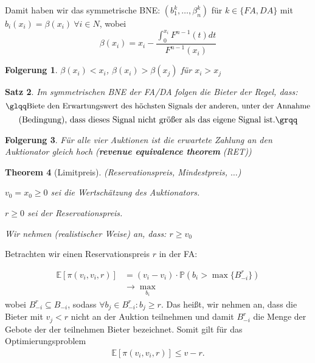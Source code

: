\documentclass[12pt]{extreport} %
\theoremstyle{named}
\newtheorem{unnamedtheorem}{Theorem} \counterwithin{unnamedtheorem}{chapter}
\theoremstyle{itshape}
\newtheorem{satz}[unnamedtheorem]{Satz}
\theoremstyle{normal}
\newtheorem{folgerung}[unnamedtheorem]{Folgerung}
\begin{document}
Damit haben wir das symmetrische BNE: $(b_{1}^{k}, \dotsc, \beta_{n}^{k})$ für $k \in \{ FA, DA \}$ mit $b_{i}(x_{i}) = \beta(x_{i}) ~\forall i \in N$, wobei
$$ \beta(x_{i}) = x_{i} - \frac{\int_{0}^{x_{i}}F^{n-1}(t) dt}{F^{n-1}(x_{i})} $$

\begin{folgerung}
	$\beta(x_{i}) < x_{i}$, $\beta(x_{i}) > \beta(x_{j})$ für $x_{i} > x_{j}$
\end{folgerung}

\begin{satz}
	Im symmetrischen BNE der FA/DA folgen die Bieter der Regel, dass: 
	$$ \text{{\glqq}Biete den Erwartungswert des höchsten Signals der anderen, unter der Annahme} $$
	$$ \text{(Bedingung), dass dieses Signal nicht größer als das eigene Signal ist.\grqq} $$
\end{satz}

\begin{folgerung}
	Für alle vier Auktionen ist die erwartete Zahlung an den Auktionator gleich hoch (\textbf{revenue equivalence theorem} (RET))
\end{folgerung}

\begin{unnamedtheorem}[Limitpreis] (Reservationspreis, Mindestpreis, $\dotsc$) 
\begin{description}
	\item $v_{0} = x_{0} \geq 0$ sei die Wertschätzung des Auktionators.
	\item $r \geq 0$ sei der Reservationspreis.
\end{description}

Wir nehmen (realistischer Weise) an, dass: $r \geq v_{0}$		
\end{unnamedtheorem}

Betrachten wir einen Reservationspreis $r$ in der FA:

\begin{align*}
	\mathbb{E}\left[ \pi\left(v_{i}, v_{i}, r \right) \right] & = \left( v_{i} - v_{i} \right) \cdot \mathbb{P}\left( b_{i} > \max \{ B_{-i}^{r} \} \right) \\
	& \rightarrow \max_{b_{i}}
\end{align*}
wobei $B_{-i}^{r} \subseteq B_{-i}$, sodass $\forall b_{j} \in B_{-i}^{r}: b_{j} \geq r$. Das heißt, wir nehmen an, dass die Bieter mit $v_{j} < r$ nicht an der Auktion teilnehmen und damit $B_{-i}^{r}$ die Menge der Gebote der der teilnehmen Bieter bezeichnet. Somit gilt für das Optimierungsproblem
\begin{align*}
	\mathbb{E}\left[ \pi\left(v_{i}, v_{i}, r \right) \right] \leq v - r.
\end{align*}
\end{document}
